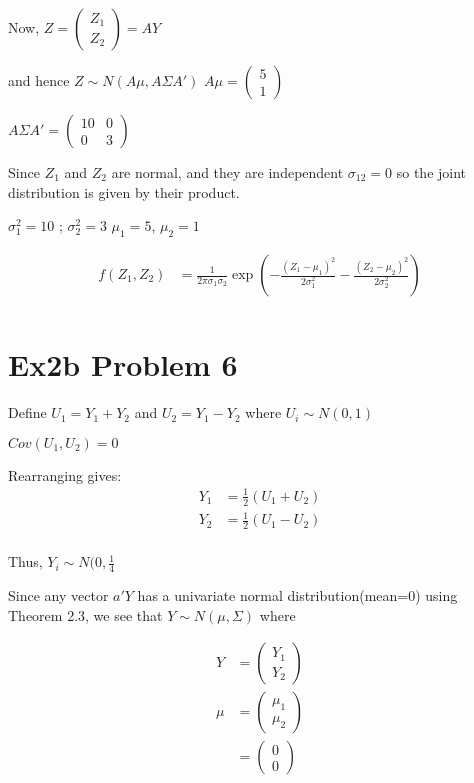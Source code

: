 \documentclass[a4paper]{article}
\begin{document}
Now, $Z = \begin{pmatrix}
Z_1\\
Z_2
\end{pmatrix} = AY$

and hence $Z \sim N(A\mu, A\Sigma A')$
$A\mu = \begin{pmatrix}
5\\
1
\end{pmatrix}$

$A\Sigma A' = \begin{pmatrix}
10 & 0\\
0 & 3
\end{pmatrix}$ 

Since $Z_1$ and $Z_2$ are normal, and they are independent $\sigma_{12}=0$ so the joint distribution is given by their product.

$\sigma_1^2 = 10$ ; $\sigma_2^2=3$
$\mu_1 = 5$, $\mu_2 =1$

\begin{align*}f(Z_1,Z_2) &= \frac{1}{2\pi \sigma_1 \sigma_2}\exp(-\frac{(Z_1-\mu_1)^2}{2\sigma_1^2}-\frac{(Z_2-\mu_2)^2}{2\sigma_2^2})\\
\end{align*}
\section*{Ex2b Problem 6}

Define $U_1 = Y_1+Y_2$ 
and $U_2 = Y_1-Y_2$ where $U_i \sim N(0,1)$

$Cov(U_1,U_2) = 0$

Rearranging gives:
\begin{align*}
Y_1 &= \frac{1}{2}(U_1+U_2)\\
Y_2 &= \frac{1}{2}(U_1-U_2)\\
\end{align*}

Thus, $Y_i \sim N(0, \frac{1}{4}$

Since any vector $a'Y$ has  a univariate normal distribution(mean=0) using Theorem 2.3, we see that $Y \sim N(\mu, \Sigma)$ where

\begin{align*}
Y &= \begin{pmatrix}
Y_1\\Y_2 \end{pmatrix}\\
\mu &= \begin{pmatrix}
\mu_1\\
\mu_2
\end{pmatrix}\\
&= \begin{pmatrix}
0\\
0
\end{pmatrix}\\
\end{align*}
\end{document}
